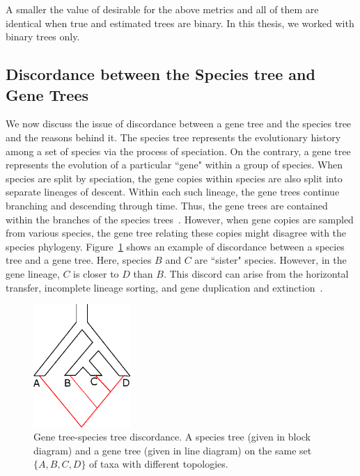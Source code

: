 A smaller the value of desirable for the above metrics and all of them are identical when true and estimated trees are binary\citep{warnow2017computational}. In this thesis, we worked with binary trees only.


\subsection{Discordance between the Species tree and Gene Trees}%
We now discuss the issue of discordance between a gene tree and the species tree and the reasons behind it. The species tree represents the evolutionary history among a set of species via the process of speciation. On the contrary, a gene tree represents the evolution of a particular ``gene" within a group of species. When species are split by speciation, the gene copies within species are also split into separate lineages of descent.  Within each such lineage, the gene trees continue branching and descending through time. Thus, the gene trees are contained within the branches of the species trees~\cite{maddison1997gene}.
However, when gene copies are sampled from various species, the gene tree relating these copies might disagree with the species phylogeny. Figure~\ref{fig:discordance} shows an example of discordance between a species tree and a gene tree. Here, species $B$ and $C$ are ``sister" species. However, in the gene lineage, $C$ is closer to $D$ than $B$. This discord can arise from the horizontal transfer, incomplete lineage sorting, and gene duplication and extinction~\cite{maddison1997gene}. 

\begin{figure}[!tb]
	\centering
	\includegraphics[width=0.33\textwidth]{Figure/discordance.eps}
	\caption{Gene tree-species tree discordance. A species tree (given in block diagram) and a gene tree (given in line diagram) on the same set $\{A,B,C,D\}$ of taxa with different topologies.}
	\label{fig:discordance}
\end{figure}




